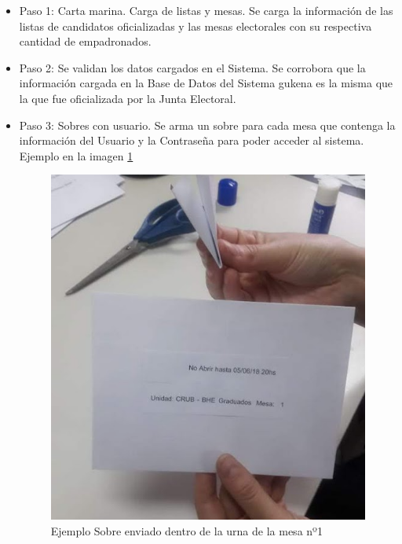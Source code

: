 \begin{itemize}

\item Paso 1: Carta marina. Carga de listas y mesas. Se carga la información de las listas de candidatos oficializadas y las mesas electorales con su respectiva cantidad de empadronados.
\item Paso 2: Se validan los datos cargados en el Sistema. Se corrobora que la información cargada en la Base de Datos del Sistema gukena es la misma que la que fue oficializada por la Junta Electoral.
\item Paso 3: Sobres con usuario. Se arma un sobre para cada mesa que contenga la información del Usuario y la Contraseña para poder acceder al sistema. Ejemplo en la imagen \ref{graf:ejemploSobre}

\begin{figure}[h!]
    \begin{center}
        \includegraphics[scale=0.5]{img/jKz6EB2F9Z.png}
    \end{center}
  \caption{Ejemplo Sobre enviado dentro de la urna de la mesa nº1}
  \label{graf:ejemploSobre}
\end{figure}


\end{itemize}
